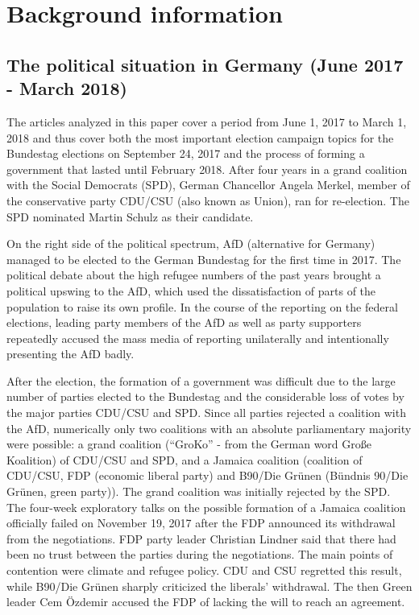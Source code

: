 \documentclass[
]{article}
\begin{document}
\hypertarget{background-information}{%
\section{Background information}\label{background-information}}

\hypertarget{the-political-situation-in-germany-june-2017---march-2018}{%
\subsection{The political situation in Germany (June 2017 - March
2018)}\label{the-political-situation-in-germany-june-2017---march-2018}}

The articles analyzed in this paper cover a period from June 1, 2017 to
March 1, 2018 and thus cover both the most important election campaign
topics for the Bundestag elections on September 24, 2017 and the process
of forming a government that lasted until February 2018. After four
years in a grand coalition with the Social Democrats (SPD), German
Chancellor Angela Merkel, member of the conservative party CDU/CSU (also
known as Union), ran for re-election. The SPD nominated Martin Schulz as
their candidate.

On the right side of the political spectrum, AfD (alternative for
Germany) managed to be elected to the German Bundestag for the first
time in 2017. The political debate about the high refugee numbers of the
past years brought a political upswing to the AfD, which used the
dissatisfaction of parts of the population to raise its own profile. In
the course of the reporting on the federal elections, leading party
members of the AfD as well as party supporters repeatedly accused the
mass media of reporting unilaterally and intentionally presenting the
AfD badly.

After the election, the formation of a government was difficult due to
the large number of parties elected to the Bundestag and the
considerable loss of votes by the major parties CDU/CSU and SPD. Since
all parties rejected a coalition with the AfD, numerically only two
coalitions with an absolute parliamentary majority were possible: a
grand coalition (``GroKo'' - from the German word Große Koalition) of
CDU/CSU and SPD, and a Jamaica coalition (coalition of CDU/CSU, FDP
(economic liberal party) and B90/Die Grünen (Bündnis 90/Die Grünen,
green party)). The grand coalition was initially rejected by the SPD.
The four-week exploratory talks on the possible formation of a Jamaica
coalition officially failed on November 19, 2017 after the FDP announced
its withdrawal from the negotiations. FDP party leader Christian Lindner
said that there had been no trust between the parties during the
negotiations. The main points of contention were climate and refugee
policy. CDU and CSU regretted this result, while B90/Die Grünen sharply
criticized the liberals' withdrawal. The then Green leader Cem Özdemir
accused the FDP of lacking the will to reach an agreement.
\end{document}
